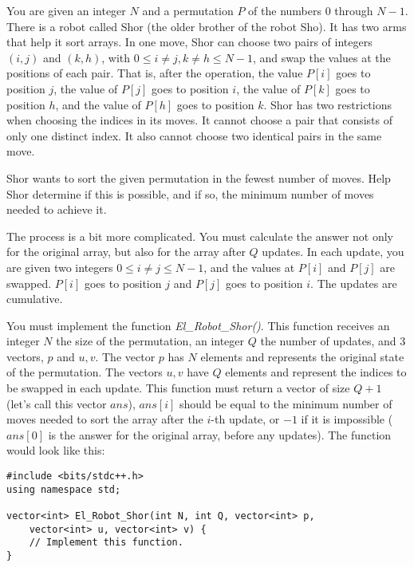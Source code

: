 \documentclass[12pt]{scrartcl}
\begin{document}
    
    \vspace{10pt}


        You are given an integer $N$ and a permutation $P$ of the numbers $0$ through $N - 1$. There is a robot called Shor (the older brother of the robot Sho). It has two arms that help it sort arrays. In one move, Shor can choose two pairs of integers $(i, j)$ and $(k, h)$, with $0 \le i \neq j, k \neq h \le N - 1$, and swap the values at the positions of each pair. That is, after the operation, the value $P[i]$ goes to position $j$, the value of $P[j]$ goes to position $i$, the value of $P[k]$ goes to position $h$, and the value of $P[h]$ goes to position $k$. Shor has two restrictions when choosing the indices in its moves. It cannot choose a pair that consists of only one distinct index. It also cannot choose two identical pairs in the same move.

        Shor wants to sort the given permutation in the fewest number of moves. Help Shor determine if this is possible, and if so, the minimum number of moves needed to achieve it.

        The process is a bit more complicated. You must calculate the answer not only for the original array, but also for the array after $Q$ updates. In each update, you are given two integers $0 \le i \neq j \le N - 1$, and the values at $P[i]$ and $P[j]$ are swapped. $P[i]$ goes to position $j$ and $P[j]$ goes to position $i$. The updates are cumulative.
        

        You must implement the function \textit{El\_Robot\_Shor()}. This function receives an integer $N$ the size of the permutation, an integer $Q$ the number of updates, and 3 vectors, $p$ and $u, v$. The vector $p$ has $N$ elements and represents the original state of the permutation. The vectors $u, v$ have $Q$ elements and represent the indices to be swapped in each update. This function must return a vector of size $Q + 1$ (let's call this vector $ans$), $ans[i]$ should be equal to the minimum number of moves needed to sort the array after the $i$-th update, or $-1$ if it is impossible ($ans[0]$ is the answer for the original array, before any updates).
        The function would look like this:

\begin{verbatim}
#include <bits/stdc++.h>
using namespace std;

vector<int> El_Robot_Shor(int N, int Q, vector<int> p,
    vector<int> u, vector<int> v) {
    // Implement this function.
}
\end{verbatim}
\end{document}
